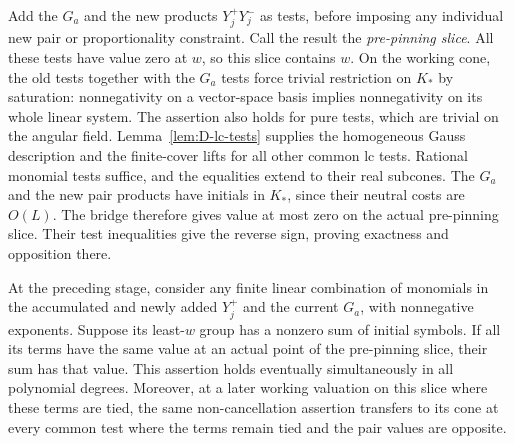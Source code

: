 Add the $G_a$ and the new products $Y_j^+Y_j^-$ as tests, before imposing
any individual new pair or proportionality constraint.  Call the result
the \emph{pre-pinning slice}.  All these tests have value zero at $w$,
so this slice contains $w$.  On the working cone, the old tests together
with the $G_a$ tests force trivial restriction on $K_*$ by saturation:
nonnegativity on a vector-space basis implies nonnegativity on its whole
linear system.  The assertion also holds for pure tests, which are
trivial on the angular field.  Lemma~\ref{lem:D-lc-tests} supplies the
homogeneous Gauss description and the finite-cover lifts for all other
common lc tests.  Rational monomial tests suffice, and the equalities
extend to their real subcones.  The $G_a$ and the new pair products have
initials in $K_*$, since their neutral costs are $O(L)$.  The bridge
therefore gives value at most zero on the actual pre-pinning slice.
Their test inequalities give the reverse sign, proving exactness and
opposition there.

\begin{lemma}\label{lem:G-noncancellation}
At the preceding stage, consider any finite linear combination of
monomials in the accumulated and newly added $Y_j^+$ and the current
$G_a$, with nonnegative exponents.  Suppose its least-$w$ group has a
nonzero sum of initial symbols.  If all its terms have the same value at
an actual point of the pre-pinning slice, their sum has that value.
This assertion holds eventually simultaneously in all polynomial degrees.
Moreover, at a later working valuation on this slice where these terms
are tied, the same non-cancellation assertion transfers to its cone at
every common test where the terms remain tied and the pair values are
opposite.
\end{lemma}

